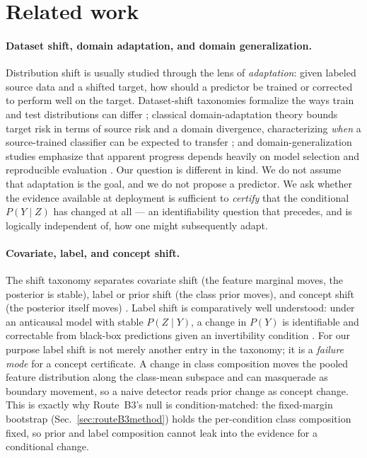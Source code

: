\section{Related work}
\label{sec:related}

\paragraph{Dataset shift, domain adaptation, and domain generalization.}
Distribution shift is usually studied through the lens of \emph{adaptation}: given labeled source data and a
shifted target, how should a predictor be trained or corrected to perform well on the target. Dataset-shift
taxonomies formalize the ways train and test distributions can differ \cite{quinonero2009datasetshift};
classical domain-adaptation theory bounds target risk in terms of source risk and a domain divergence,
characterizing \emph{when} a source-trained classifier can be expected to transfer \cite{bendavid2010domains};
and domain-generalization studies emphasize that apparent progress depends heavily on model selection and
reproducible evaluation \cite{gulrajani2021domainbed}. Our question is different in kind. We do not assume that
adaptation is the goal, and we do not propose a predictor. We ask whether the evidence available at deployment
is sufficient to \emph{certify} that the conditional $P(Y\mid Z)$ has changed at all --- an identifiability
question that precedes, and is logically independent of, how one might subsequently adapt.

\paragraph{Covariate, label, and concept shift.}
The shift taxonomy separates covariate shift (the feature marginal moves, the posterior is stable), label or
prior shift (the class prior moves), and concept shift (the posterior itself moves)
\cite{quinonero2009datasetshift}. Label shift is comparatively well understood: under an anticausal model with
stable $P(Z\mid Y)$, a change in $P(Y)$ is identifiable and correctable from black-box predictions given an
invertibility condition \cite{lipton2018labelshift}. For our purpose label shift is not merely another entry in
the taxonomy; it is a \emph{failure mode} for a concept certificate. A change in class composition moves the
pooled feature distribution along the class-mean subspace and can masquerade as boundary movement, so a naive
detector reads prior change as concept change. This is exactly why Route~B3's null is condition-matched: the
fixed-margin bootstrap (Sec.~\ref{sec:routeB3method}) holds the per-condition class composition fixed, so
prior and label composition cannot leak into the evidence for a conditional change.

